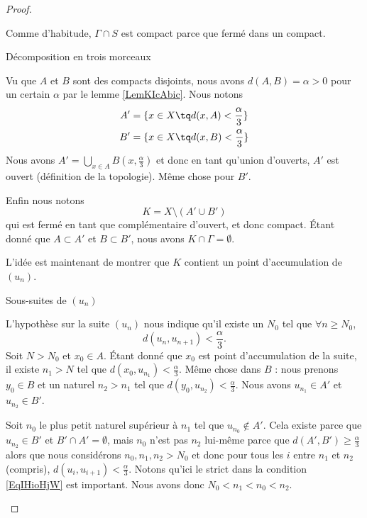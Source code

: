 \begin{proof}
\begin{subproof}
        Comme d'habitude, \( \Gamma\cap S\) est compact parce que fermé dans un compact.

    \item[Décomposition en trois morceaux]

        Vu que \( A\) et \( B\) sont des compacts disjoints, nous avons \( d(A,B)=\alpha>0\) pour un certain \( \alpha\) par le lemme \ref{LemKIcAbic}. Nous notons
        \begin{subequations}
            \begin{align}
                A'&=\{x\in X\tq d(x,A)<\frac{ \alpha }{ 3 }\}\\
                B'&=\{x\in X\tq d(x,B)<\frac{ \alpha }{ 3 }\}
            \end{align}
        \end{subequations}
        Nous avons \( A'=\bigcup_{x\in A}B(x,\frac{ \alpha }{ 3 })\) et donc en tant qu'union d'ouverts, \( A'\) est ouvert (définition de la topologie). Même chose pour \( B'\).

        Enfin nous notons 
        \begin{equation}
            K=X\setminus(A'\cup B')
        \end{equation}
        qui est fermé en tant que complémentaire d'ouvert, et donc compact. Étant donné que \( A\subset A'\) et \( B\subset B' \), nous avons \( K\cap \Gamma=\emptyset\).

        L'idée est maintenant de montrer que \( K\) contient un point d'accumulation de \( (u_n)\).

    \item[Sous-suites de \( (u_n)\)]

        L'hypothèse sur la suite \( (u_n)\) nous indique qu'il existe un \( N_0\) tel que \( \forall n\geq N_0\),
        \begin{equation}    \label{EqIHioHjW}
            d(u_{n},u_{n+1})<\frac{ \alpha }{ 3 }.
        \end{equation}
        Soit \( N>N_0 \) et \( x_0\in A\). Étant donné que \( x_0\) est point d'accumulation de la suite, il existe \( n_1>N\) tel que \( d(x_0,u_{n_1})<\frac{ \alpha }{ 3 }\). Même chose dans \( B\) : nous prenons \( y_0\in B\) et un naturel \( n_2>n_1\) tel que \( d(y_0,u_{n_2})<\frac{ \alpha }{ 3 }\). Nous avons \( u_{n_1}\in A'\) et \( u_{n_2}\in B'\).

        Soit \( n_0\) le plus petit naturel supérieur à \( n_1\) tel que \( u_{n_0}\notin A'\). Cela existe parce que \( u_{n_2}\in B'\) et \( B'\cap A'=\emptyset\), mais \( n_0\) n'est pas \( n_2\) lui-même parce que \( d(A',B')\geq \frac{ \alpha }{ 3 }\) alors que nous considérons \( n_0,n_1,n_2>N_0\) et donc pour tous les \( i\) entre \( n_1\) et \( n_2\) (compris), \( d(u_i,u_{i+1})<\frac{ \alpha }{ 3 }\). Notons qu'ici le strict dans la condition \eqref{EqIHioHjW} est important. Nous avons donc \(N_0<n_1<n_0<n_2\).


\end{subproof}
\end{proof}
